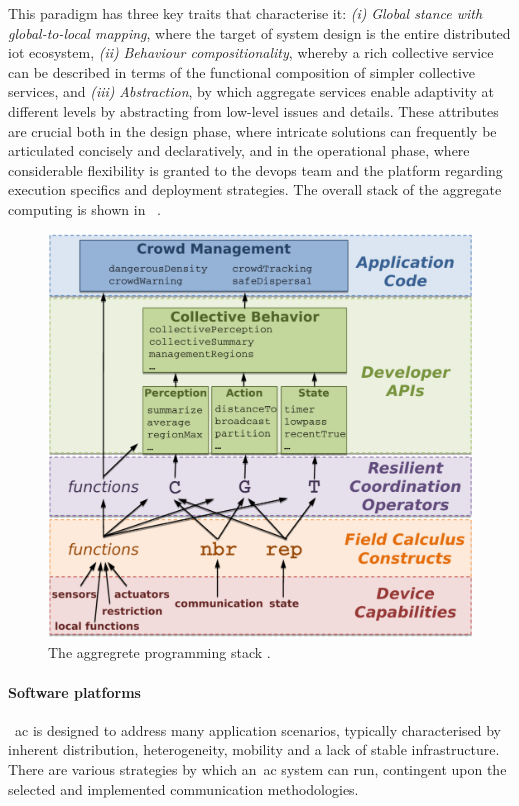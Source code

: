 This paradigm has three key traits that characterise it:
    \emph{(i)} \emph{Global stance with global-to-local mapping}, where the target of system design is the entire distributed
        \ac{iot} ecosystem,
    \emph{(ii)} \emph{Behaviour compositionality}, whereby a rich collective service can be described in terms of the functional
        composition of simpler collective services, and
    \emph{(iii)} \emph{Abstraction}, by which aggregate services enable adaptivity at different levels by abstracting from low-level
        issues and details.
These attributes are crucial both in the design phase, where intricate solutions can frequently be articulated concisely
and declaratively, and in the operational phase, where considerable flexibility is granted to the devops team and the
platform regarding execution specifics and deployment strategies.
The overall stack of the aggregate computing is shown in ~.


\begin{figure}
    \centering
    \includegraphics[width=.7\linewidth]{figures/aggregate-programming-stack}
    \caption{The aggregrete programming stack \cite{7274429}.}
    \label{fig:ac-stack}
\end{figure}

\paragraph{Software platforms}
~\ac{ac} is designed to address many application scenarios, typically characterised by inherent distribution, heterogeneity,
mobility and a lack of stable infrastructure.
There are various strategies by which an~\ac{ac} system can run, contingent upon the selected and implemented
communication methodologies.

